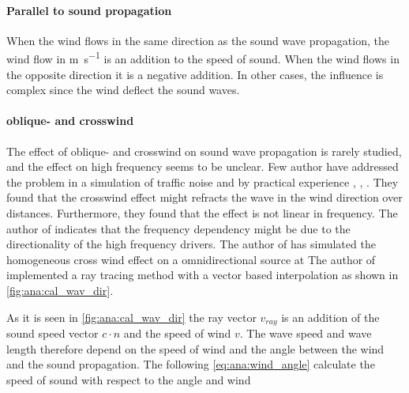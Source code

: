 \paragraph{Parallel to sound propagation} When the wind flows in the same direction as the sound wave propagation, the wind flow in \si{\meter\per\second} is an addition to the speed of sound. When the wind flows in the opposite direction it is a negative addition.  In other cases, the influence is complex since the wind deflect the sound waves.

\paragraph{oblique- and crosswind} The effect of oblique- and crosswind on sound wave propagation is rarely studied, and the effect on high frequency seems to be unclear. Few author have addressed the problem in a simulation of traffic noise and by practical experience \citep{effect_of_wind}, \citep{crosswind_effect_2016}, \citep{BALLOU2008xi}. They found that the crosswind effect might refracts the wave in the wind direction over distances. Furthermore, they found that the effect is not linear in frequency. The author of \citep{BALLOU2008xi} indicates that the frequency dependency might be due to the directionality of the high frequency drivers. The author of \citep{crosswind_simulation} has simulated the homogeneous cross wind effect on a omnidirectional source at  The author of \citep{ray_tracing} implemented a ray tracing method with a vector based interpolation as shown in \autoref{fig:ana:cal_wav_dir}.



\startexplain
{}
\stopexplain

As it is seen in \autoref{fig:ana:cal_wav_dir} the ray vector $v_{ray}$ is an addition of the sound speed vector $c \cdot n$ and the speed of wind $v$. The wave speed and wave length therefore depend on the speed of wind and the angle between the wind and the sound propagation. The following \autoref{eq:ana:wind_angle} calculate the speed of sound with respect to the angle and wind 


